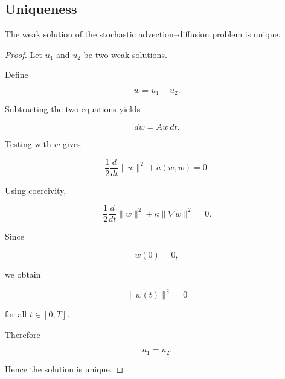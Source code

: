 \subsection{Uniqueness}

\begin{theorem}
The weak solution of the stochastic advection--diffusion problem is unique.
\end{theorem}

\begin{proof}

Let $u_1$ and $u_2$ be two weak solutions.

Define

\[
w=u_1-u_2.
\]

Subtracting the two equations yields

\[
dw
=
Aw\,dt.
\]

Testing with $w$ gives

\[
\frac12
\frac{d}{dt}
\|w\|^2
+
a(w,w)
=
0.
\]

Using coercivity,

\[
\frac12
\frac{d}{dt}
\|w\|^2
+
\kappa
\|\nabla w\|^2
=
0.
\]

Since

\[
w(0)=0,
\]

we obtain

\[
\|w(t)\|^2=0
\]

for all $t\in[0,T]$.

Therefore

\[
u_1=u_2.
\]

Hence the solution is unique.
\end{proof}